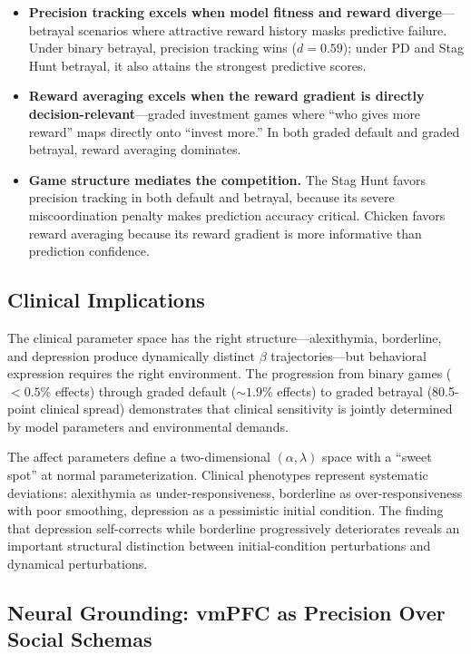 \documentclass[11pt,a4paper]{article}
\begin{document}
\begin{itemize}[nosep]
  \item \textbf{Precision tracking excels when model fitness and reward diverge}---betrayal scenarios where attractive reward history masks predictive failure. Under binary betrayal, precision tracking wins ($d = 0.59$); under PD and Stag Hunt betrayal, it also attains the strongest predictive scores.
  \item \textbf{Reward averaging excels when the reward gradient is directly decision-relevant}---graded investment games where ``who gives more reward'' maps directly onto ``invest more.'' In both graded default and graded betrayal, reward averaging dominates.
  \item \textbf{Game structure mediates the competition.} The Stag Hunt favors precision tracking in both default and betrayal, because its severe miscoordination penalty makes prediction accuracy critical. Chicken favors reward averaging because its reward gradient is more informative than prediction confidence.
\end{itemize}

\subsection{Clinical Implications}

The clinical parameter space has the right structure---alexithymia, borderline, and depression produce dynamically distinct $\beta$ trajectories---but behavioral expression requires the right environment. The progression from binary games ($< 0.5\%$ effects) through graded default ($\sim\!1.9\%$ effects) to graded betrayal (80.5-point clinical spread) demonstrates that clinical sensitivity is jointly determined by model parameters and environmental demands.

The affect parameters define a two-dimensional $(\alpha, \lambda)$ space with a ``sweet spot'' at normal parameterization. Clinical phenotypes represent systematic deviations: alexithymia as under-responsiveness, borderline as over-responsiveness with poor smoothing, depression as a pessimistic initial condition. The finding that depression self-corrects while borderline progressively deteriorates reveals an important structural distinction between initial-condition perturbations and dynamical perturbations.

\subsection{Neural Grounding: vmPFC as Precision Over Social Schemas}
\end{document}
